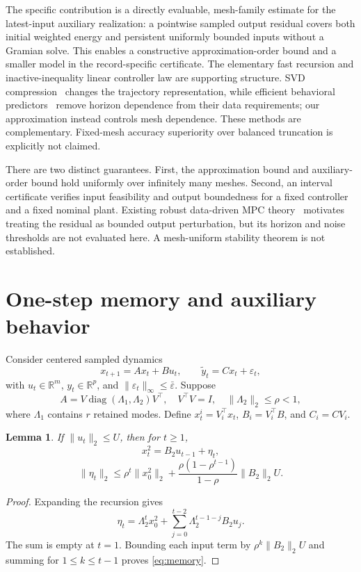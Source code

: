 \documentclass[letterpaper,10pt,conference]{ieeeconf}
\newtheorem{lemma}{Lemma}
\theoremstyle{remark}\newtheorem{remark}{Remark}
\begin{document}
The specific contribution is a directly evaluable, mesh-family estimate for the latest-input auxiliary realization: a pointwise sampled output residual covers both initial weighted energy and persistent uniformly bounded inputs without a Gramian solve. This enables a constructive approximation-order bound and a smaller model in the record-specific certificate. The elementary fast recursion and inactive-inequality linear controller law are supporting structure. SVD compression~\cite{zhang} changes the trajectory representation, while efficient behavioral predictors~\cite{alsalti} remove horizon dependence from their data requirements; our approximation instead controls mesh dependence. These methods are complementary. Fixed-mesh accuracy superiority over balanced truncation is explicitly not claimed.

There are two distinct guarantees. First, the approximation bound and auxiliary-order bound hold uniformly over infinitely many meshes. Second, an interval certificate verifies input feasibility and output boundedness for a fixed controller and a fixed nominal plant. Existing robust data-driven MPC theory~\cite{bongard} motivates treating the residual as bounded output perturbation, but its horizon and noise thresholds are not evaluated here. A mesh-uniform stability theorem is not established.

\section{One-step memory and auxiliary behavior}
Consider centered sampled dynamics
\begin{equation}\label{eq:plant}
x_{t+1}=Ax_t+Bu_t,\qquad \tilde y_t=Cx_t+\varepsilon_t,
\end{equation}
with $u_t\in\mathbb R^m$, $y_t\in\mathbb R^p$, and $\|\varepsilon_t\|_\infty\le\bar\varepsilon$. Suppose
\[
A=V\operatorname{diag}(\Lambda_1,\Lambda_2)V^\top,
\quad V^\top V=I,\quad \|\Lambda_2\|_2\le\rho<1,
\]
where $\Lambda_1$ contains $r$ retained modes. Define $x_t^i=V_i^\top x_t$, $B_i=V_i^\top B$, and $C_i=CV_i$.

\begin{lemma}\label{lem:memory}
If $\|u_t\|_2\le U$, then for $t\ge1$,
\[
x_t^2=B_2u_{t-1}+\eta_t,
\]
\begin{equation}\label{eq:memory}
\|\eta_t\|_2\le\rho^t\|x_0^2\|_2+
\frac{\rho(1-\rho^{t-1})}{1-\rho}\|B_2\|_2U.
\end{equation}
\end{lemma}
\begin{proof}
Expanding the recursion gives
\[
\eta_t=\Lambda_2^t x_0^2+
\sum_{j=0}^{t-2}\Lambda_2^{t-1-j}B_2u_j.
\]
The sum is empty at $t=1$. Bounding each input term by $\rho^k\|B_2\|_2U$ and summing for $1\le k\le t-1$ proves \eqref{eq:memory}.
\end{proof}
\end{document}
